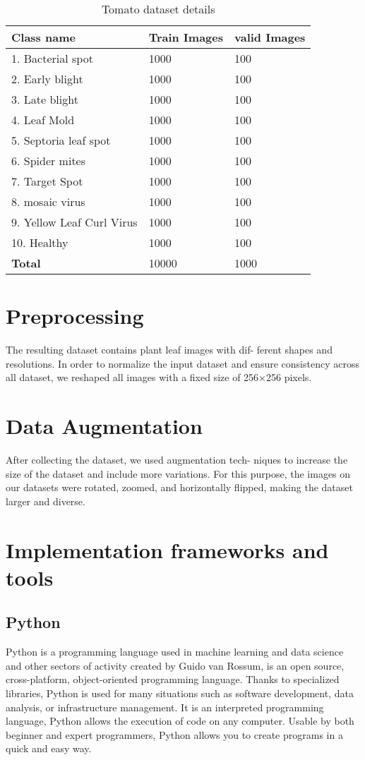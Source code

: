 \begin{table}[]
\begin{tabular}{@{}|p{9cm}|p{3cm}|p{3cm}|@{}}
\hline
 \centering \textbf{Class name} & \textbf{Train Images} & \textbf{valid Images}  \\ \hline
 1. Bacterial spot & 1000 & 100 \\
 2. Early blight & 1000 & 100 \\
 3. Late blight & 1000 & 100 \\ 
 4. Leaf Mold & 1000 & 100\\
 5. Septoria leaf spot & 1000 & 100\\
 6. Spider mites & 1000 & 100\\
 7. Target Spot & 1000 & 100\\
 8. mosaic virus & 1000 & 100\\
 9. Yellow Leaf Curl Virus & 1000 & 100\\
10. Healthy & 1000 & 100 \\

 \hline
 \centering \textbf{Total} & 10000 & 1000\\ \hline
\end{tabular}
\caption{Tomato dataset details}
\end{table}

\section{Preprocessing}
The resulting dataset contains plant leaf images with dif-
ferent shapes and resolutions. In order to normalize the input
dataset and ensure consistency across all dataset, we reshaped
all images with a fixed size of 256×256 pixels.
\section{Data Augmentation}
After collecting the dataset, we used augmentation tech-
niques to increase the size of the dataset and include more
variations. For this purpose, the images on our datasets were
rotated, zoomed, and horizontally flipped, making the dataset
larger and diverse.
\section{Implementation frameworks and tools}
\subsection{Python}
Python is a programming language used in machine learning and data science
and other sectors of activity created by Guido van Rossum, is an open source, cross-platform, object-oriented programming language. Thanks to specialized libraries, Python is used for many situations such as software development, data analysis, or infrastructure management. It is an interpreted programming language, Python allows the execution of code on any computer. Usable by both beginner and expert programmers, Python allows you to create programs in a quick and easy way.\cite{w2}
